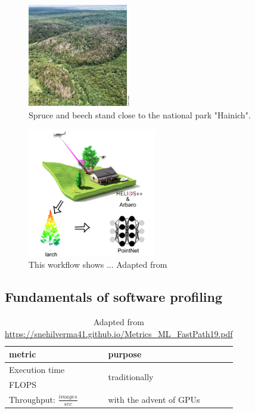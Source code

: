 \documentclass[12pt, a4paper, hidelinks]{article}
\begin{document}
\begin{figure}[H]
\centering
\includegraphics[width=0.4\textwidth]{assets/beech_drought}
\caption*{Spruce and beech stand close to the national park "Hainich".}
\label{fig:uav-hainich}
\end{figure}


\begin{figure}[H]
\centering
\includegraphics[width=0.5\textwidth]{assets/workflow_synthetic_data}
\caption[Synthetic- lidar workflow]{This workflow shows ... Adapted from \cite{9906068}}
\label{fig:lidar-workflow}
\end{figure}

\subsection{Fundamentals of software profiling}
\label{sec:profiling}

\begin{table}[H]
\label{tab:metrics}
\centering
\begin{tabular}{@{}ll@{}}
\toprule
metric                                                                                 & purpose                        \\ \midrule
Execution time                                                                         & \multirow{2}{*}{traditionally} \\
FLOPS                                                                                  &                                \\ \midrule
Throughput: $\frac{images}{sec}$                                                       & with the advent of GPUs        \\ \bottomrule
\end{tabular}
\caption{Adapted from \url{https://snehilverma41.github.io/Metrics_ML_FastPath19.pdf}}
\end{table}
\end{document}
